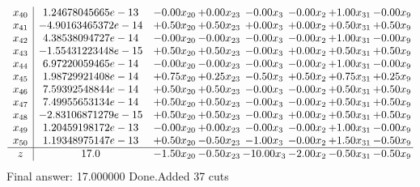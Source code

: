 \documentclass[8pt]{article}
\begin{document}
\[\begin{array}{c| c c@{\hskip 2pt} c@{\hskip 2pt} c@{\hskip 2pt} c@{\hskip 2pt} c@{\hskip 2pt} c@{\hskip 2pt} }
 x_{40}   &  1.24678045665e-13 & -0.00 x_{20} & +  0.00 x_{23} & -0.00 x_{3} & -0.00 x_{2} & +  1.00 x_{31} & -0.00 x_{9}\\
 x_{41}   &  -4.90163465372e-14 & +  0.50 x_{20} & +  0.50 x_{23} & +  0.00 x_{3} & +  0.00 x_{2} & +  0.50 x_{31} & +  0.50 x_{9}\\
 x_{42}   &  4.38538094727e-14 & -0.00 x_{20} & -0.00 x_{23} & -0.00 x_{3} & -0.00 x_{2} & +  1.00 x_{31} & -0.00 x_{9}\\
 x_{43}   &  -1.55431223448e-15 & +  0.50 x_{20} & +  0.50 x_{23} & -0.00 x_{3} & +  0.00 x_{2} & +  0.50 x_{31} & +  0.50 x_{9}\\
 x_{44}   &  6.97220059465e-14 & -0.00 x_{20} & -0.00 x_{23} & -0.00 x_{3} & -0.00 x_{2} & +  1.00 x_{31} & -0.00 x_{9}\\
 x_{45}   &  1.98729921408e-14 & +  0.75 x_{20} & +  0.25 x_{23} & -0.50 x_{3} & +  0.50 x_{2} & +  0.75 x_{31} & +  0.25 x_{9}\\
 x_{46}   &  7.59392548844e-14 & +  0.50 x_{20} & +  0.50 x_{23} & -0.00 x_{3} & -0.00 x_{2} & +  0.50 x_{31} & +  0.50 x_{9}\\
 x_{47}   &  7.49955653134e-14 & +  0.50 x_{20} & +  0.50 x_{23} & -0.00 x_{3} & -0.00 x_{2} & +  0.50 x_{31} & +  0.50 x_{9}\\
 x_{48}   &  -2.83106871279e-15 & +  0.50 x_{20} & +  0.50 x_{23} & -0.00 x_{3} & +  0.00 x_{2} & +  0.50 x_{31} & +  0.50 x_{9}\\
 x_{49}   &  1.20459198172e-13 & -0.00 x_{20} & +  0.00 x_{23} & -0.00 x_{3} & -0.00 x_{2} & +  1.00 x_{31} & -0.00 x_{9}\\
 x_{50}   &  1.19348975147e-13 & +  0.50 x_{20} & -0.50 x_{23} & -1.00 x_{3} & -0.00 x_{2} & +  1.50 x_{31} & -0.50 x_{9}\\
\hline
z    &  17.0 & -1.50 x_{20} & -0.50 x_{23} & -10.00 x_{3} & -2.00 x_{2} & -0.50 x_{31} & -0.50 x_{9}\\
\end{array}\]
 Final answer: 17.000000 
Done.Added 37 cuts 
\end{document}
